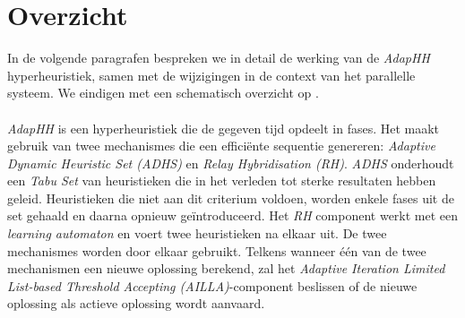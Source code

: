 \section{Overzicht}

In de volgende paragrafen bespreken we in detail de werking van de \emph{AdapHH} hyperheuristiek, samen met de wijzigingen in de context van het parallelle systeem. We eindigen met een schematisch overzicht op .

\paragraph{}
\emph{AdapHH} is een hyperheuristiek die de gegeven tijd opdeelt in fases. Het maakt gebruik van twee mechanismes die een effici\"ente sequentie genereren: \emph{Adaptive Dynamic Heuristic Set (ADHS)} en \emph{Relay Hybridisation (RH)}. \emph{ADHS} onderhoudt een \emph{Tabu Set} van heuristieken die in het verleden tot sterke resultaten hebben geleid. Heuristieken die niet aan dit criterium voldoen, worden enkele fases uit de set gehaald en daarna opnieuw ge\"introduceerd. Het \emph{RH} component werkt met een \emph{learning automaton}\cite{RePEc:cla:levarc:481} en voert twee heuristieken na elkaar uit. De twee mechanismes worden door elkaar gebruikt. Telkens wanneer \'e\'en van de twee mechanismen een nieuwe oplossing berekend, zal het \emph{Adaptive Iteration Limited List-based Threshold Accepting (AILLA)}-component beslissen of de nieuwe oplossing als actieve oplossing wordt aanvaard.